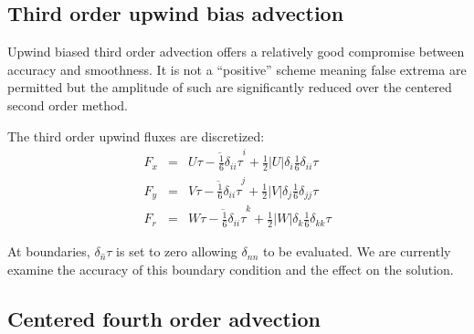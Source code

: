 \subsection{Third order upwind bias advection}

Upwind biased third order advection offers a relatively good
compromise between accuracy and smoothness. It is not a ``positive''
scheme meaning false extrema are permitted but the amplitude of such
are significantly reduced over the centered second order method.

The third order upwind fluxes are discretized:
\begin{eqnarray}
F_x & = & U \overline{\tau - \frac{1}{6} \delta_{ii} \tau}^i
         + \frac{1}{2} |U| \delta_i \frac{1}{6} \delta_{ii} \tau \\
F_y & = & V \overline{\tau - \frac{1}{6} \delta_{ii} \tau}^j
         + \frac{1}{2} |V| \delta_j \frac{1}{6} \delta_{jj} \tau \\
F_r & = & W \overline{\tau - \frac{1}{6} \delta_{ii} \tau}^k
         + \frac{1}{2} |W| \delta_k \frac{1}{6} \delta_{kk} \tau 
\end{eqnarray}

At boundaries, $\delta_{\hat{n}} \tau$ is set to zero allowing
$\delta_{nn}$ to be evaluated. We are currently examine the accuracy
of this boundary condition and the effect on the solution.


\subsection{Centered fourth order advection}

